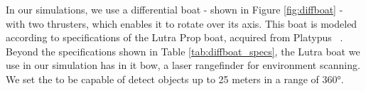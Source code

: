     In our simulations, we use a differential boat - shown in Figure \ref{fig:diffboat} - with two thrusters, which enables it to rotate over its axis. This boat is modeled according to specifications of the Lutra Prop boat, acquired from Platypus ~\cite{PlatypusLLC}. Beyond the specifications shown in Table \ref{tab:diffboat_specs}, the Lutra boat we use in our simulation has in it bow, a laser rangefinder for environment scanning. We set the to be capable of detect objects up to 25 meters in a range of 360°.
    
    
